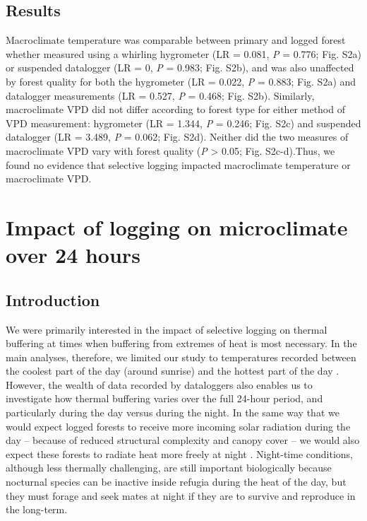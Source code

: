 \documentclass[12pt,a4paper,]{report}
\theoremstyle{definition}
\theoremstyle{definition}
\theoremstyle{definition}
\theoremstyle{remark}
\begin{document}
\subsection{Results}\label{results-5}

Macroclimate temperature was comparable between primary and logged
forest whether measured using a whirling hygrometer (LR = 0.081,
\emph{P} = 0.776; Fig. S2a) or suspended datalogger (LR = 0, \emph{P} =
0.983; Fig. S2b), and was also unaffected by forest quality for both the
hygrometer (LR = 0.022, \emph{P} = 0.883; Fig. S2a) and datalogger
measurements (LR = 0.527, \emph{P} = 0.468; Fig. S2b). Similarly,
macroclimate VPD did not differ according to forest type for either
method of VPD measurement: hygrometer (LR = 1.344, \emph{P} = 0.246;
Fig. S2c) and suspended datalogger (LR = 3.489, \emph{P} = 0.062; Fig.
S2d). Neither did the two measures of macroclimate VPD vary with forest
quality (\emph{P} \textgreater{} 0.05; Fig. S2c-d).Thus, we found no
evidence that selective logging impacted macroclimate temperature or
macroclimate VPD.

\pagebreak

\section{Impact of logging on microclimate over 24
hours}\label{text-B-5}

\subsection{Introduction}\label{introduction-4}

We were primarily interested in the impact of selective logging on
thermal buffering at times when buffering from extremes of heat is most
necessary. In the main analyses, therefore, we limited our study to
temperatures recorded between the coolest part of the day (around
sunrise) and the hottest part of the day \citep[around noon;
cf.][]{scheffers_extreme_2017}. However, the wealth of data recorded by
dataloggers also enables us to investigate how thermal buffering varies
over the full 24-hour period, and particularly during the day versus
during the night. In the same way that we would expect logged forests to
receive more incoming solar radiation during the day -- because of
reduced structural complexity and canopy cover
\citep{okuda_effect_2003, kumar_effects_2005} -- we would also expect
these forests to radiate heat more freely at night
\citep{chen_growing-season_1995}. Night-time conditions, although less
thermally challenging, are still important biologically because
nocturnal species can be inactive inside refugia during the heat of the
day, but they must forage and seek mates at night if they are to survive
and reproduce in the long-term.
\end{document}

